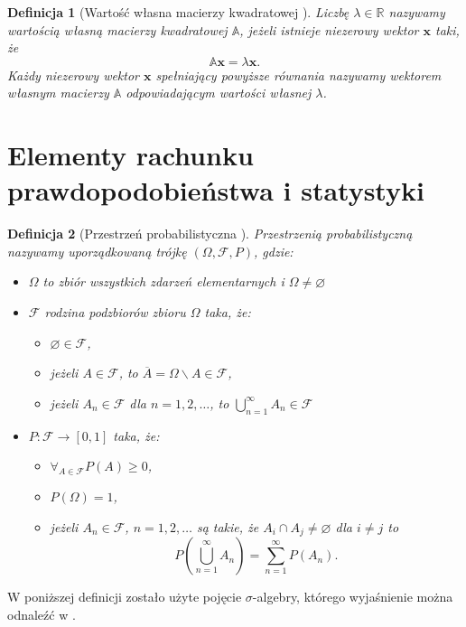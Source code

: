 \documentclass[12pt,a4paper]{report}
\newtheorem{df}{Definicja}[chapter]
\newcommand{\setR}{\mathbb{R}}
\begin{document}
\begin{df}[Wartość własna macierzy kwadratowej {\citep[Sec 12.2]{alzega}}]
Liczbę $\lambda \in \setR$ nazywamy wartością własną macierzy kwadratowej $\mathbb{A}$, jeżeli istnieje niezerowy wektor $\mathbf{x}$ taki, że
$$
\mathbb{A}\mathbf{x}=\lambda\mathbf{x}.
$$
Każdy niezerowy wektor $\mathbf{x}$ spełniający powyższe równania nazywamy wektorem własnym macierzy $\mathbb{A}$ odpowiadającym wartości własnej $\lambda$.
\end{df}


\section{Elementy rachunku prawdopodobieństwa i statystyki}

\begin{df}[Przestrzeń probabilistyczna {\citep[Sec 1.2, Sec 1.4]{wztp}}]
Przestrzenią probabilistyczną nazywamy uporządkowaną trójkę $(\Omega, \mathcal{F}, P)$, gdzie:
\begin{itemize}
\item $\Omega$ to zbiór wszystkich zdarzeń elementarnych i $\Omega \neq \varnothing$
\item $ \mathcal{F} $ rodzina podzbiorów zbioru $\Omega$ taka, że:
\begin{itemize}
\item $\varnothing \in \mathcal{F} $,
\item jeżeli $ \mathit{A} \in \mathcal{F}$, to $\overline{\mathit{A}} = \Omega \backslash \mathit{A} \in \mathcal{F}$,
\item jeżeli $ \mathit{A}_n \in \mathcal{F}$ dla $n=1,2,\ldots$, to $\bigcup_{n=1}^{\infty} \mathit{A}_n \in \mathcal{F}$
\end{itemize}
\item $P : \mathcal{F} \to [0,1]$ taka, że:
\begin{itemize}
\item $\forall_{\mathit{A} \in \mathcal{F}} P(\mathit{A}) \geq 0$,
\item $P(\Omega) = 1$,
\item jeżeli $ \mathit{A}_n \in \mathcal{F}$, $n=1,2,\ldots$ są takie, że $\mathit{A}_i \cap \mathit{A}_j \neq \varnothing$ dla $i \neq j$ to
$$
P(\bigcup_{n=1}^{\infty} \mathit{A}_n) = \sum_{n=1}^{\infty} P(\mathit{A}_n).
$$
\end{itemize}
\end{itemize}
\end{df}

W poniższej definicji zostało użyte pojęcie $\sigma$-algebry, którego wyjaśnienie można odnaleźć w {\citep[Sec 1.2 Def. 1.2]{wztp}}.
\end{document}
